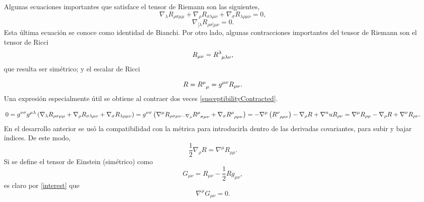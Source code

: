 Algunas ecuaciones importantes que satisface el tensor de Riemann son las siguientes,
\begin{equation}\label{susceptibilityContracted}
\nabla_\lambda R_{\rho\sigma\mu\mu}+\nabla_\rho R_{\sigma\lambda\mu\nu}+\nabla_\sigma R_{\lambda\rho\mu\nu}=0,
\end{equation}
\begin{equation}
\nabla_{[\lambda}R_{\rho\sigma]\mu\nu}=0.
\end{equation}
Esta última ecuación se conoce como identidad de Bianchi. Por otro lado, algunas contracciones importantes del tensor de Riemann son el tensor de Ricci
\begin{equation}\label{ricciTensor}
	R_{\mu\nu}=R\indices{^\lambda_{\mu\lambda\nu}},
\end{equation}
que resulta ser simétrico; y el escalar de Ricci

\begin{equation}\label{ricciScalar}
	R=R\indices{^\mu_\mu}=g^{\mu\nu}R_{\mu\nu}.
\end{equation}
Una expresión especialmente útil se obtiene al contraer dos veces \eqref{susceptibilityContracted}.

\begin{dmath*}
0=g^{\nu\sigma}g^{\mu\lambda}\left(\nabla_\lambda R_{\rho\sigma\mu\mu}+\nabla_\rho R_{\sigma\lambda\mu\nu}+\nabla_\sigma R_{\lambda\rho\mu\nu}\right) = g^{\nu\sigma}\left(\nabla^\mu R_{\rho\sigma\mu\nu-\nabla_\rho} R\indices{^\mu_{\sigma\mu\nu}}+\nabla_\sigma R\indices{^\mu_{\rho\mu\nu}}\right) = -\nabla^\mu\left( R\indices{^\nu_{\rho\mu\nu}}\right)-\nabla_\rho R+\nabla^nu R_{\rho\nu} = \nabla^\mu R_{\rho\mu}-\nabla_\rho R+\nabla^\nu R_{\rho\nu}.
\end{dmath*}
En el desarrollo anterior se usó la compatibilidad con la métrica para introducirla dentro de las derivadas covariantes, para subir y bajar índices. De este modo,
\begin{equation}\label{interest}
\frac{1}{2}\nabla_\rho R=\nabla^\mu R_{\rho\mu}.
\end{equation}
Si se define el tensor de Einstein (simétrico) como 
\begin{equation}
	G_{\mu\nu}=R_{\mu\nu}-\frac{1}{2}Rg_{\mu\nu},
\end{equation}
es claro por \eqref{interest} que
\begin{equation}
	\nabla^\mu G_{\mu\nu}=0.
\end{equation}
